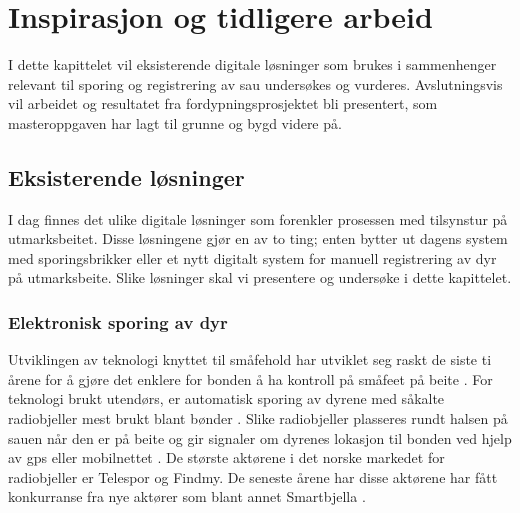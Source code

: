 \chapter{Inspirasjon og tidligere arbeid}
I dette kapittelet vil eksisterende digitale løsninger som brukes i sammenhenger relevant til sporing og registrering av sau undersøkes og vurderes. Avslutningsvis vil arbeidet og resultatet fra fordypningsprosjektet bli presentert, som masteroppgaven har lagt til grunne og bygd videre på.  

\section{Eksisterende løsninger}
I dag finnes det ulike digitale løsninger som forenkler prosessen med tilsynstur på utmarksbeitet. Disse løsningene gjør en av to ting; enten bytter ut dagens system med sporingsbrikker eller et nytt digitalt system for manuell registrering av dyr på utmarksbeite. Slike løsninger skal vi presentere og undersøke i dette kapittelet. 

\subsection{Elektronisk sporing av dyr} \label{sporing}
 Utviklingen av teknologi knyttet til småfehold har utviklet seg raskt de siste ti årene for å gjøre det enklere for bonden å ha kontroll på småfeet på beite \cite[~s.49-50]{BungerSmafenaring2018}. For teknologi brukt utendørs, er automatisk sporing av dyrene med såkalte radiobjeller mest brukt blant bønder \cite[~s.50]{BungerSmafenaring2018}. Slike radiobjeller plasseres rundt halsen på sauen når den er på beite og gir signaler om dyrenes lokasjon til bonden ved hjelp av \acrshort{gps} eller mobilnettet \cite{Fremstad2020SauebnderRuralis}. De største aktørene i det norske markedet for radiobjeller er Telespor \cite{Telespora} og Findmy. De seneste årene har disse aktørene har fått konkurranse fra nye aktører som blant annet Smartbjella \cite{SmartbjellaSporing}.  
 
